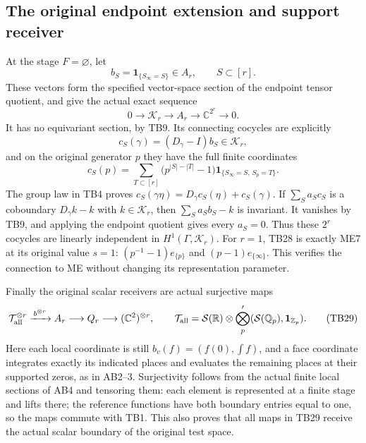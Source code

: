 \subsection{The original endpoint extension and support receiver}

At the stage \(F=\varnothing\), let
\[
b_S=\mathbf1_{\{S_\infty=S\}}\in A_r,\qquad S\subset[r].
\]
These vectors form the specified vector-space section of the
endpoint tensor quotient, and give the actual exact sequence
\[
0\longrightarrow\mathcal K_r\longrightarrow A_r
 \longrightarrow\mathbb C^{2^r}\longrightarrow0.
\tag{TB27}
\]
It has no equivariant section, by TB9.
Its connecting cocycles are explicitly
\[
c_S(\gamma)=(D_\gamma-I)b_S\in\mathcal K_r,
\]
and on the original generator \(p\) they have the full finite
coordinates
\[
c_S(p)=
\sum_{T\subset[r]}
\bigl(p^{|S|-|T|}-1\bigr)
       \mathbf1_{\{S_\infty=S,\,S_p=T\}}.
\tag{TB28}
\]
The group law in TB4 proves
\(c_S(\gamma\eta)=D_\gamma c_S(\eta)+c_S(\gamma)\).
If \(\sum_S a_Sc_S\) is a coboundary \(D_\gamma k-k\) with
\(k\in\mathcal K_r\), then \(\sum_Sa_Sb_S-k\) is invariant.
It vanishes by TB9, and applying the endpoint quotient gives
every \(a_S=0\). Thus these \(2^r\) cocycles are linearly
independent in \(H^1(\Gamma,\mathcal K_r)\).
For \(r=1\), TB28 is exactly ME7 at its original value \(s=1\):
\((p^{-1}-1)e_{\{p\}}\) and \((p-1)e_{\{\infty\}}\).
This verifies the connection to ME without changing its
representation parameter.

Finally the original scalar receivers are actual surjective maps
\[
\mathcal T_{\rm all}^{\otimes r}
 \xrightarrow{\,b^{\otimes r}\,} A_r
 \longrightarrow Q_r
 \longrightarrow(\mathbb C^2)^{\otimes r},
\qquad
\mathcal T_{\rm all}
=\mathcal S(\mathbb R)\otimes
 \bigotimes_p'(\mathcal S(\mathbb Q_p),\mathbf1_{\mathbb Z_p}).
\tag{TB29}
\]
Here each local coordinate is still
\(b_v(f)=(f(0),\int f)\), and a face coordinate integrates
exactly its indicated places and evaluates the remaining
places at their supported zeros, as in AB2--3.
Surjectivity follows from the actual finite local sections
of AB4 and tensoring them: each element is represented at a
finite stage and lifts there; the reference functions have
both boundary entries equal to one, so the maps commute with
TB1. This also proves that all maps in TB29 receive the actual
scalar boundary of the original test space.

